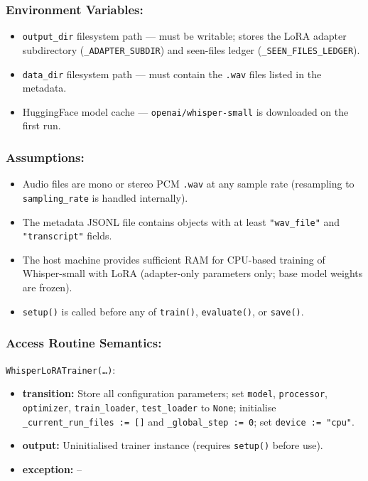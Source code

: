 \documentclass[12pt, titlepage]{article}
\begin{document}
\subsubsection{Environment Variables:}
\begin{itemize}
  \item \texttt{output\_dir} filesystem path — must be writable; stores the LoRA adapter subdirectory (\texttt{\_ADAPTER\_SUBDIR}) and seen-files ledger (\texttt{\_SEEN\_FILES\_LEDGER}).
  \item \texttt{data\_dir} filesystem path — must contain the \texttt{.wav} files listed in the metadata.
  \item HuggingFace model cache — \texttt{openai/whisper-small} is downloaded on the first run.
\end{itemize}

\subsubsection{Assumptions:}
\begin{itemize}
  \item Audio files are mono or stereo PCM \texttt{.wav} at any sample rate (resampling to \texttt{sampling\_rate} is handled internally).
  \item The metadata JSONL file contains objects with at least \texttt{"wav\_file"} and \texttt{"transcript"} fields.
  \item The host machine provides sufficient RAM for CPU-based training of Whisper-small with LoRA (adapter-only parameters only; base model weights are frozen).
  \item \texttt{setup()} is called before any of \texttt{train()}, \texttt{evaluate()}, or \texttt{save()}.
\end{itemize}

\subsubsection{Access Routine Semantics:}

\noindent\texttt{WhisperLoRATrainer(\ldots)}:
\begin{itemize}
  \item \textbf{transition:} Store all configuration parameters; set \texttt{model}, \texttt{processor}, \texttt{optimizer}, \texttt{train\_loader}, \texttt{test\_loader} to \texttt{None}; initialise \texttt{\_current\_run\_files := []} and \texttt{\_global\_step := 0}; set \texttt{device := "cpu"}.
  \item \textbf{output:} Uninitialised trainer instance (requires \texttt{setup()} before use).
  \item \textbf{exception:} --
\end{itemize}
\end{document}
